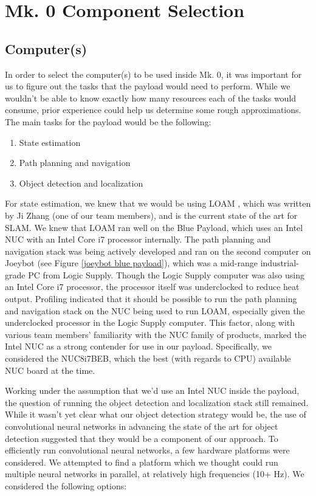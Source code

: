 \section{Mk. 0 Component Selection}

\subsection{Computer(s)}

In order to select the computer(s) to be used inside Mk. 0, it was important for us to figure out the tasks that the payload would need to perform. While we wouldn't be able to know exactly how many resources each of the tasks would consume, prior experience could help us determine some rough approximations. The main tasks for the payload would be the following:

\begin{enumerate}
	\item State estimation
	\item Path planning and navigation
	\item Object detection and localization
\end{enumerate}

For state estimation, we knew that we would be using LOAM \cite{zhang2014loam}, which was written by Ji Zhang (one of our team members), and is the current state of the art for SLAM. We knew that LOAM ran well on the Blue Payload, which uses an Intel NUC with an Intel Core i7 processor internally. The path planning and navigation stack was being actively developed and ran on the second computer on Joeybot (see Figure \ref{joeybot blue payload}), which was a mid-range industrial-grade PC from Logic Supply. Though the Logic Supply computer was also using an Intel Core i7 processor, the processor itself was underclocked to reduce heat output. Profiling indicated that it should be possible to run the path planning and navigation stack on the NUC being used to run LOAM, especially given the underclocked processor in the Logic Supply computer. This factor, along with various team members' familiarity with the NUC family of products, marked the Intel NUC as a strong contender for use in our payload. Specifically, we considered the NUC8i7BEB, which the best (with regards to CPU) available NUC board at the time.

Working under the assumption that we'd use an Intel NUC inside the payload, the question of running the object detection and localization stack still remained. While it wasn't yet clear what our object detection strategy would be, the use of convolutional neural networks in advancing the state of the art for object detection suggested that they would be a component of our approach. To efficiently run convolutional neural networks, a few hardware platforms were considered. We attempted to find a platform which we thought could run multiple neural networks in parallel, at relatively high frequencies (10+ Hz). We considered the following options:

